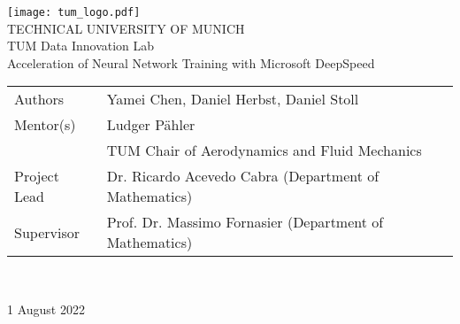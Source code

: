 



    \pagestyle{empty}


    \begin{titlepage}

      \begin{center}
        \texttt{[image: tum\_logo.pdf]}\\[20mm]
        \sf
        {\huge
          TECHNICAL UNIVERSITY OF MUNICH\\[20mm]
          TUM Data Innovation Lab\\[20mm]
        }
        \normalsize
        \renewcommand{\baselinestretch}{2}\normalsize
        {\Huge
        Acceleration of Neural Network Training with Microsoft DeepSpeed
        }
        \renewcommand{\baselinestretch}{1}\normalsize
        \bigskip
      \end{center}

      \vspace*{20mm}
      \large

      \begin{tabular}{ll}
        Authors &  Yamei Chen, Daniel Herbst, Daniel Stoll  \\
        Mentor(s) & Ludger P\"ahler \\
        & TUM Chair of Aerodynamics and Fluid Mechanics \\
        Project Lead & Dr. Ricardo Acevedo Cabra (Department of Mathematics)\\
        Supervisor & Prof. Dr. Massimo Fornasier (Department of Mathematics)\\
      \end{tabular}
      \\

      \begin{center}
        \vspace*{10mm}
        1 August 2022
      \end{center}

    \end{titlepage}

    \newpage 
    \pagestyle{headings}


